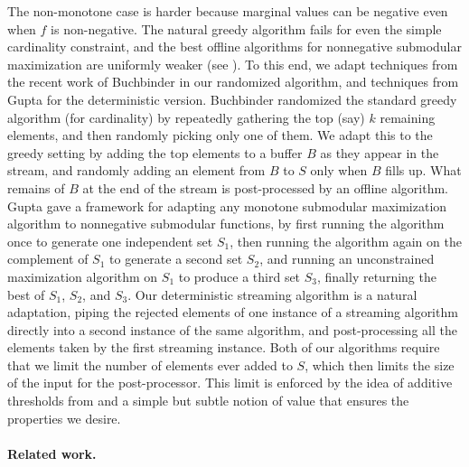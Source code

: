 \documentclass[oneside,letterpaper]{scrartcl} \usepackage{macros}
\begin{document}
The non-monotone case is harder because marginal values can be
negative even when $f$ is non-negative. The natural greedy algorithm
fails for even the simple cardinality constraint, and the best offline
algorithms for nonnegative submodular maximization are uniformly
weaker (see ).  To this end, we adapt techniques
from the recent work of Buchbinder \etal \cite{bfns-smcc-14} in our
randomized algorithm, and techniques from Gupta \etal \cite{grst-10}
for the deterministic version. Buchbinder \etal randomized the
standard greedy algorithm (for cardinality) by repeatedly gathering
the top (say) $k$ remaining elements, and then randomly picking only
one of them. We adapt this to the greedy setting by adding the top
elements to a buffer $B$ as they appear in the stream, and randomly
adding an element from $B$ to $S$ only when $B$ fills up. What remains
of $B$ at the end of the stream is post-processed by an offline
algorithm. Gupta \etal gave a framework for adapting any monotone
submodular maximization algorithm to nonnegative submodular functions,
by first running the algorithm once to generate one independent set
$S_1$, then running the algorithm again on the complement of $S_1$ to
generate a second set $S_2$, and running an unconstrained maximization
algorithm on $S_1$ to produce a third set $S_3$, finally returning the
best of $S_1$, $S_2$, and $S_3$. Our deterministic streaming algorithm
is a natural adaptation, piping the rejected elements of one instance
of a streaming algorithm directly into a second instance of the same
algorithm, and post-processing all the elements taken by the first
streaming instance. Both of our algorithms require that we limit the
number of elements ever added to $S$, which then limits the size of
the input for the post-processor. This limit is enforced by the idea
of additive thresholds from \cite{bmkk-sso-14} and a simple but subtle
notion of value that ensures the properties we desire.



\iffalse ; if $S$ is the current feasible solution at the beginning of
iteration and $A = \{ e \mid S+e \in \independents\}$ is the set of
elements that can be added to $S$ while maintaining feasibility,
greedy picks the element $e = \text{argmax}_{e'} f_S(e')$.  A special
case that illustrates the main ideas is the simple cardinality
constraint where the goal is to solve $\max_{|S| \le k} f(S)$. In the
offline setting the greedy algorithm picks in each iteration the
element that \fi


\paragraph{Related work.}
\end{document}
